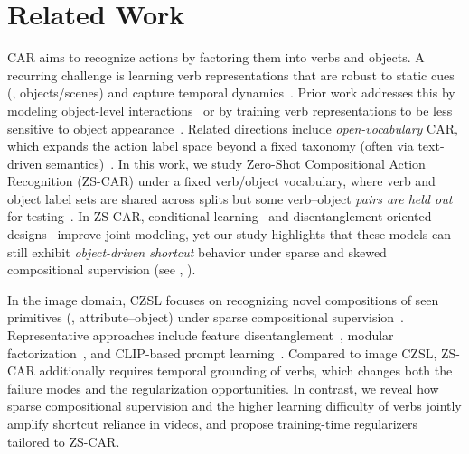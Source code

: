 \section{Related Work}
\label{sec:related}



CAR aims to recognize actions by factoring them into verbs and objects.
A recurring challenge is learning verb representations that are robust to static cues (\eg, objects/scenes) and capture temporal dynamics~\cite{mat2020sthelse, sun2021cdn, chatterjee2023oap,liu2025knowledgedriven}.
Prior work addresses this by modeling object-level interactions~\cite{mat2020sthelse, sun2021cdn} or by training verb representations to be less sensitive to object appearance~\cite{chatterjee2023oap}.
Related directions include \emph{open-vocabulary} CAR, which expands the action label space beyond a fixed taxonomy (often via text-driven semantics)~\cite{luo2022dark, chatterjee2023oap}.
In this work, we study Zero-Shot Compositional Action Recognition (ZS-CAR) under a fixed verb/object vocabulary, where verb and object label sets are shared across splits but some verb--object \emph{pairs are held out} for testing~\cite{li2024c2c, jiang2025dhd, jung2025crr, ye2025logic}.
In ZS-CAR, conditional learning~\cite{li2024c2c, jiang2025dhd} and disentanglement-oriented designs~\cite{jung2025crr} improve joint modeling, yet our study highlights that these models can still exhibit \emph{object-driven shortcut} behavior under sparse and skewed compositional supervision (see , ).

 





In the image domain, CZSL focuses on recognizing novel compositions of seen primitives (\eg, attribute–object) under sparse compositional supervision~\cite{misra2017red, naeem2021czsl, mancini2021compcos, kim2023hierarchical,wu2025cond, nayak2023csp}.
Representative approaches include feature disentanglement~\cite{saini2022disen, zhang2024disen}, modular factorization~\cite{purushwalkam2019taskdriven}, and CLIP-based prompt learning~\cite{nayak2023csp, li2024context}.
Compared to image CZSL, ZS-CAR additionally requires temporal grounding of verbs, which changes both the failure modes and the regularization opportunities.
In contrast, we reveal how sparse compositional supervision and the higher learning difficulty of verbs jointly amplify shortcut reliance in videos, and propose training-time regularizers tailored to ZS-CAR.






